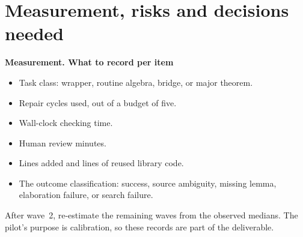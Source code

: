 \documentclass[11pt,a4paper]{article}
\newcommand{\stage}[2]{\par\needspace{4\baselineskip}\textbf{#1. #2}\par}
\begin{document}
\newpage
\section{Measurement, risks and decisions needed}\label{sec:measure}
\stage{Measurement}{What to record per item}
\begin{itemize}
  \item Task class: wrapper, routine algebra, bridge, or major theorem.
  \item Repair cycles used, out of a budget of five.
  \item Wall-clock checking time.
  \item Human review minutes.
  \item Lines added and lines of reused library code.
  \item The outcome classification: success, source ambiguity, missing lemma,
  elaboration failure, or search failure.
\end{itemize}
After wave~2, re-estimate the remaining waves from the observed medians. The
pilot's purpose is calibration, so these records are part of the deliverable.
\end{document}
